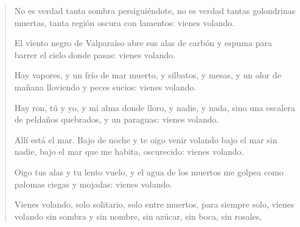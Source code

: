 \documentclass[12pt]{article}
\begin{document}
\begin{verse}
No es verdad tanta sombra persiguiéndote,
no es verdad tantas golondrinas muertas,
tanta región oscura con lamentos:
vienes volando.

El viento negro de Valparaíso
abre sus alas de carbón y espuma
para barrer el cielo donde pasas:
vienes volando.

Hay vapores, y un frío de mar muerto,
y silbatos, y mesas, y un olor
de mañana lloviendo y peces sucios:
vienes volando.

Hay ron, tú y yo, y mi alma donde lloro,
y nadie, y nada, sino una escalera
de peldaños quebrados, y un paraguas:
vienes volando.

Allí está el mar. Bajo de noche y te oigo
venir volando bajo el mar sin nadie,
bajo el mar que me habita, oscurecido:
vienes volando.

Oigo tus alas y tu lento vuelo,
y el agua de los muertos me golpea
como palomas ciegas y mojadas:
vienes volando.

Vienes volando, solo solitario,
solo entre muertos, para siempre solo,
vienes volando sin sombra y sin nombre,
sin azúcar, sin boca, sin rosales,

\end{verse}
\end{document}
